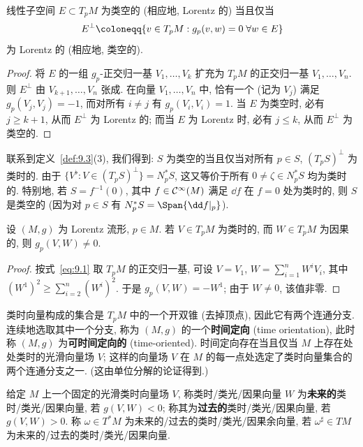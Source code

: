 \begin{lemma}[类空子空间]\label{lem:9.5}
线性子空间 $E \subset T_p M$ 为类空的 (相应地, Lorentz 的) 当且仅当
\[
    E^\perp \defeq \{v \in T_p M : g_p(v, w) = 0 \; \forall w \in E\}
\]
为 Lorentz 的 (相应地, 类空的).
\end{lemma}

\begin{proof}
将 $E$ 的一组 $g_p$-正交归一基 $V_1, \ldots, V_k$ 扩充为 $T_p M$ 的正交归一基 $V_1, \ldots, V_n$. 则 $E^\perp$ 由 $V_{k+1}, \ldots, V_n$ 张成. 在向量 $V_1, \ldots, V_n$ 中, 恰有一个 (记为 $V_j$) 满足 $g_p(V_j, V_j) = -1$, 而对所有 $i \neq j$ 有 $g_p(V_i, V_i) = 1$. 当 $E$ 为类空时, 必有 $j \ge k+1$, 从而 $E^\perp$ 为 Lorentz 的; 而当 $E$ 为 Lorentz 时, 必有 $j \le k$, 从而 $E^\perp$ 为类空的.
\end{proof}

联系到定义~\ref{def:9.3}(3), 我们得到: $S$ 为类空的当且仅当对所有 $p \in S$, $(T_p S)^\perp$ 为类时的. 由于 $\{V^\flat : V \in (T_p S)^\perp\} = N_p^* S$, 这又等价于所有 $0 \neq \zeta \in N_p^* S$ 均为类时的. 特别地, 若 $S = f^{-1}(0)$, 其中 $f \in \mathcal{C}^\infty(M)$ 满足 $\dd f$ 在 $f = 0$ 处为类时的, 则 $S$ 是类空的 (因为对 $p \in S$ 有 $N_p^* S = \Span\{\dd f|_p\}$).

\begin{lemma}[类时向量与因果向量]\label{lem:9.6}
设 $(M, g)$ 为 Lorentz 流形, $p \in M$. 若 $V \in T_p M$ 为类时的, 而 $W \in T_p M$ 为因果的, 则 $g_p(V, W) \neq 0$.
\end{lemma}

\begin{proof}
按式~\eqref{eq:9.1} 取 $T_p M$ 的正交归一基, 可设 $V = V_1$, $W = \sum_{i=1}^{n} W^i V_i$, 其中 $(W^1)^2 \ge \sum_{i=2}^{n} (W^i)^2$. 于是 $g_p(V, W) = -W^1$; 由于 $W \neq 0$, 该值非零.
\end{proof}

类时向量构成的集合是 $T_p M$ 中的一个开双锥 (去掉顶点), 因此它有两个连通分支. 连续地选取其中一个分支, 称为 $(M, g)$ 的一个\textbf{时间定向} (time orientation), 此时称 $(M, g)$ 为\textbf{可时间定向的} (time-oriented). 时间定向存在当且仅当 $M$ 上存在处处类时的光滑向量场 $V$; 这样的向量场 $V$ 在 $M$ 的每一点处选定了类时向量集合的两个连通分支之一. (这由单位分解的论证得到.)

\begin{definition}[时间定向]\label{def:9.7}
给定 $M$ 上一个固定的光滑类时向量场 $V$, 称类时/类光/因果向量 $W$ 为\textbf{未来的}类时/类光/因果向量, 若 $g(V, W) < 0$; 称其为\textbf{过去的}类时/类光/因果向量, 若 $g(V, W) > 0$. 称 $\omega \in T^* M$ 为未来的/过去的类时/类光/因果余向量, 若 $\omega^\sharp \in TM$ 为未来的/过去的类时/类光/因果向量.
\end{definition}

